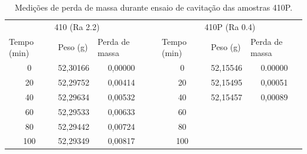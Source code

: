 \begin{table}[]
\centering
\caption{Medições de perda de massa durante ensaio de cavitação das amostras 410P.}
\label{tab:cav_hvof3}
\begin{tabular}{ccccccc}
\cline{1-3} \cline{5-7}
\multicolumn{3}{c}{410 (Ra 2.2)}                                                                        &                       & \multicolumn{3}{c}{410P (Ra 0.4)}                                                                      \\ \cline{1-3} \cline{5-7} 
\multicolumn{1}{|l|}{Tempo (min)} & \multicolumn{1}{l|}{Peso (g)} & \multicolumn{1}{l|}{Perda de massa} & \multicolumn{1}{l|}{} & \multicolumn{1}{l|}{Tempo (min)} & \multicolumn{1}{l|}{Peso (g)} & \multicolumn{1}{l|}{Perda de massa} \\ \cline{1-3} \cline{5-7} 
\multicolumn{1}{|c|}{0}           & \multicolumn{1}{c|}{52,30166} & \multicolumn{1}{c|}{0,00000}        & \multicolumn{1}{l|}{} & \multicolumn{1}{c|}{0}           & \multicolumn{1}{c|}{52,15546} & \multicolumn{1}{c|}{0.00000}        \\ \cline{1-3} \cline{5-7} 
\multicolumn{1}{|c|}{20}          & \multicolumn{1}{c|}{52,29752} & \multicolumn{1}{c|}{0,00414}        & \multicolumn{1}{l|}{} & \multicolumn{1}{c|}{20}          & \multicolumn{1}{c|}{52,15495} & \multicolumn{1}{c|}{0,00051}        \\ \cline{1-3} \cline{5-7} 
\multicolumn{1}{|c|}{40}          & \multicolumn{1}{c|}{52,29634} & \multicolumn{1}{c|}{0,00532}        & \multicolumn{1}{l|}{} & \multicolumn{1}{c|}{40}          & \multicolumn{1}{c|}{52,15457} & \multicolumn{1}{c|}{0,00089}        \\ \cline{1-3} \cline{5-7} 
\multicolumn{1}{|c|}{60}          & \multicolumn{1}{c|}{52,29533} & \multicolumn{1}{c|}{0,00633}        & \multicolumn{1}{l|}{} & \multicolumn{1}{c|}{60}          & \multicolumn{1}{c|}{}         & \multicolumn{1}{c|}{}               \\ \cline{1-3} \cline{5-7} 
\multicolumn{1}{|c|}{80}          & \multicolumn{1}{c|}{52,29442} & \multicolumn{1}{c|}{0,00724}        & \multicolumn{1}{l|}{} & \multicolumn{1}{c|}{80}          & \multicolumn{1}{c|}{}         & \multicolumn{1}{c|}{}               \\ \cline{1-3} \cline{5-7} 
\multicolumn{1}{|c|}{100}         & \multicolumn{1}{c|}{52,29349} & \multicolumn{1}{c|}{0,00817}        & \multicolumn{1}{c|}{} & \multicolumn{1}{c|}{100}         & \multicolumn{1}{c|}{}         & \multicolumn{1}{c|}{}               \\ \cline{1-3} \cline{5-7} 

\end{tabular}
\end{table}
